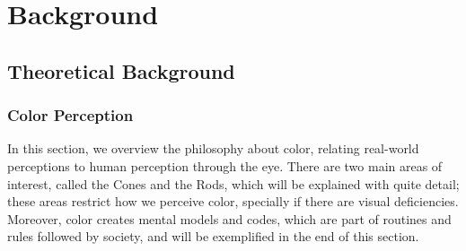 
\chapter{Background}
\label{chapter:background}

\section{Theoretical Background}
\label{sec:theory_background}

\subsection{Color Perception}
\label{subsec:colorperception}
%
In this section, we overview the philosophy about color, relating real-world perceptions to human perception
through the eye. There are two main areas of interest, called the Cones and the Rods, which will be explained
with quite detail; these areas restrict how we perceive color, specially if there are visual deficiencies.
Moreover, color creates mental models and codes, which are part of routines and rules followed by society, and will be exemplified in the end of this section.
%
